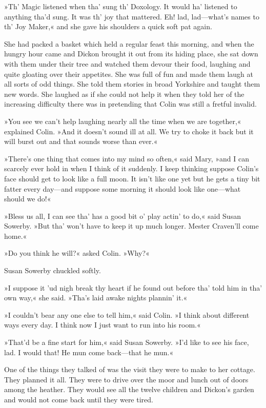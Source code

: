 »Th' Magic listened when tha' sung th' Doxology. It would ha' listened to anything tha'd sung. It was th' joy that mattered. Eh! lad, lad—what's names to th' Joy Maker,« and she gave his shoulders a quick soft pat again.

She had packed a basket which held a regular feast this morning, and when the hungry hour came and Dickon brought it out from its hiding place, she sat down with them under their tree and watched them devour their food, laughing and quite gloating over their appetites. She was full of fun and made them laugh at all sorts of odd things. She told them stories in broad Yorkshire and taught them new words. She laughed as if she could not help it when they told her of the increasing difficulty there was in pretending that Colin was still a fretful invalid.

»You see we can't help laughing nearly all the time when we are together,« explained Colin. »And it doesn't sound ill at all. We try to choke it back but it will burst out and that sounds worse than ever.«

»There's one thing that comes into my mind so often,« said Mary, »and I can scarcely ever hold in when I think of it suddenly. I keep thinking suppose Colin's face should get to look like a full moon. It isn't like one yet but he gets a tiny bit fatter every day—and suppose some morning it should look like one—what should we do!«

»Bless us all, I can see tha' has a good bit o' play actin' to do,« said Susan Sowerby. »But tha' won't have to keep it up much longer. Mester Craven'll come home.«

»Do you think he will?« asked Colin. »Why?«

Susan Sowerby chuckled softly.

»I suppose it 'ud nigh break thy heart if he found out before tha' told him in tha' own way,« she said. »Tha's laid awake nights plannin' it.«

»I couldn't bear any one else to tell him,« said Colin. »I think about different ways every day. I think now I just want to run into his room.«

»That'd be a fine start for him,« said Susan Sowerby. »I'd like to see his face, lad. I would that! He mun come back—that he mun.«

One of the things they talked of was the visit they were to make to her cottage. They planned it all. They were to drive over the moor and lunch out of doors among the heather. They would see all the twelve children and Dickon's garden and would not come back until they were tired.

